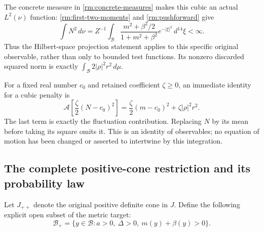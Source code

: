 The concrete measure in \eqref{rm:concrete-measures} makes this cubic
an actual $L^2(\nu)$ function: \eqref{rm:first-two-moments} and
\eqref{rm:pushforward} give
\[
 \int N^2\,d\nu
 =Z^{-1}\int_{\mathcal B}
 \frac{m^2+\beta^2/2}{1+m^2+\beta^2}e^{-|\xi|^2}\,d^{14}\xi<\infty.
\]
Thus the Hilbert-space projection statement applies to this specific
original observable, rather than only to bounded test functions.
Its nonzero discarded squared norm is exactly
$\int_{\mathcal B}2|\rho|^2r^2\,d\mu$.

For a fixed real number $c_0$ and retained coefficient $\zeta\geq0$,
an immediate identity for a cubic penalty is
\begin{equation}\label{rm:cubic-penalty}
 \mathcal A\!\left[\frac{\zeta}{2}(N-c_0)^2\right]
 =\frac{\zeta}{2}(m-c_0)^2+\zeta|\rho|^2r^2.
\end{equation}
The last term is exactly the fluctuation contribution. Replacing
$N$ by its mean before taking its square omits it. This is an identity
of observables; no equation of motion has been changed or asserted
to intertwine by this integration.

\subsection{The complete positive-cone restriction and its probability law}

Let $J_{++}$ denote the original positive definite cone in $J$. Define
the following explicit open subset of the metric target:
\begin{equation}\label{rm:positive-image}
 \mathcal B_+=\{y\in\mathcal B:
        a>0,\ \Delta>0,\ m(y)+\beta(y)>0\}.
\end{equation}

